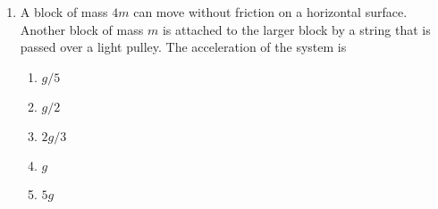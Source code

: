 \documentclass{../../../oss-apphys}
\begin{document}
\begin{multicols}{2}
\begin{enumerate}[resume,leftmargin=18pt]
    \columnbreak
    
  \item A block of mass $4m$ can move without friction on a horizontal surface.
    Another block of mass $m$ is attached to the larger block by a string that
    is passed over a light pulley. The acceleration of the system is

    \vspace{-.1in}
    \begin{enumerate}[nosep,leftmargin=18pt,label=(\Alph*)]
    \item $g/5$
    \item $g/2$
    \item $2g/3$
    \item $g$
    \item $5g$
    \end{enumerate}



\end{enumerate}
\end{multicols}
\end{document}
